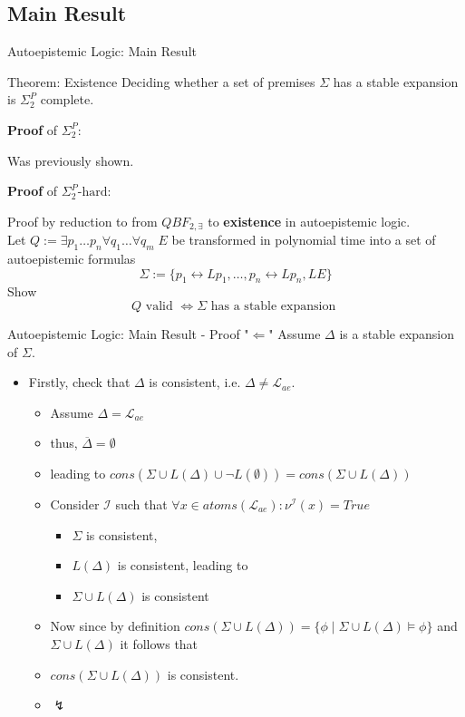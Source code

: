 \documentclass[usenames,dvipsnames, 8pt]{beamer}
\let\liff\leftrightarrow
\begin{document}
\subsection{Main Result}
\begin{frame}{Autoepistemic Logic: Main Result}
\begin{block}{Theorem: Existence}
Deciding whether a set of premises $\Sigma$ has a stable expansion is $\Sigma_2^P$ complete.
\end{block}

\textbf{Proof} of $\Sigma_2^P$: 

Was previously shown.


\textbf{Proof} of $\Sigma_2^P\text{-hard}$:

Proof by reduction to from $QBF_{2,\exists}$ to \textbf{existence} in autoepistemic logic. \\
Let $Q:= \exists p_1 \dots p_n \forall q_1 \dots \forall q_m \; E$ be transformed in polynomial time into a set of autoepistemic formulas 
\begin{equation*}
\Sigma:=\{p_1 \liff Lp_1, \dots, p_n \liff Lp_n, LE\}
\end{equation*}
Show
\begin{equation*}
Q \text{ valid } \iff \Sigma \text{ has a stable expansion }
\end{equation*}


\end{frame}


\begin{frame}{Autoepistemic Logic: Main Result - Proof "$\Longleftarrow$"}
Assume $\Delta$ is a stable expansion of $\Sigma$.
\begin{itemize}[label = {$\bullet$}]
\item Firstly, check that $\Delta$ is consistent, i.e. $\Delta \neq \mathcal{L}_{ae}$.
\begin{itemize}[label={-}]
\item  Assume $\Delta = \mathcal{L}_{ae}$ 
\item thus, $\overline{\Delta}=\emptyset$ 
\item leading to $cons(\Sigma \cup L(\Delta) \cup \neg L(\emptyset)) = cons(\Sigma \cup L(\Delta) )$ 
\item Consider $\mathcal{I}$ such that $\forall x \in atoms(\mathcal{L}_{ae}): \nu^{\mathcal{I}}(x)=True$
\begin{itemize}[label={$>$}]
\item $\Sigma$ is consistent,
\item $L(\Delta)$ is consistent, leading to
\item $\Sigma \cup L(\Delta)$ is consistent
\end{itemize}
\item Now since by definition $cons(\Sigma \cup L(\Delta))= \{\phi \mid \Sigma \cup L(\Delta) \models \phi\}$ and $\Sigma \cup L(\Delta)$ it follows that
\item $cons(\Sigma \cup L(\Delta))$ is consistent. 
\item $\lightning$
\end{itemize}
\end{itemize}
\end{frame}
\end{document}
